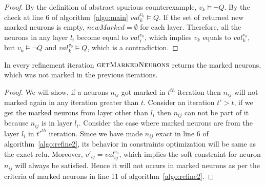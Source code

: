 \begin{proof}
By the definition of abstract spurious counterexample, ${v_k} \models \lnot Q$. 
By the check at line 6 of algorithm~\ref{algo:main} ${val_k^{{v_0}}} \models Q$. 
If the set of returned new marked neurons is empty, $newMarked = \emptyset$ for each layer. 
Therefore, all the neurons in any layer $l_i$ become equal to ${val_i^{{v_0}}}$,  
which implies ${v_k}$ equals to ${val_k^{{v_0}}}$, but ${v_k} \models \lnot Q$ and 
${val_k^{{v_0}}} \models Q$, which is a contradiction.   
\end{proof}


\begin{theorem}
  \label{th:progress2}
  In every refinement iteration $\textsc{getMarkedNeurons}$
  returns the marked neurons, which was not marked in the previous iterations. 
\end{theorem}

\begin{proof}
We will show, if a neurons $n_{ij}$ got marked in $t^{th}$ iteration then $n_{ij}$ will not marked again 
in any iteration greater than $t$.
Consider an iteration $t' > t$, if we get the marked neurons from layer other
than $l_i$ then $n_{ij}$ can not be part of it because $n_{ij}$ is in layer $l_i$. 
Consider the case where marked neurons are from the layer $l_i$ in $t'^{th}$ iteration. 
Since we have made $n_{ij}$ exact in line 6 of algorithm~\ref{algo:refine2},
its behavior in constraints optimization will be same as the exact relu. 
Moreover, $v'_{ij} = val_{ij}^{v_0}$, 
which implies the soft constraint for neuron $n_{ij}$ will always be satisfied. Hence it will not occurs in 
marked neurons as per the criteria of marked neurons in line 11 of algorithm~\ref{algo:refine2}.   
\end{proof}


